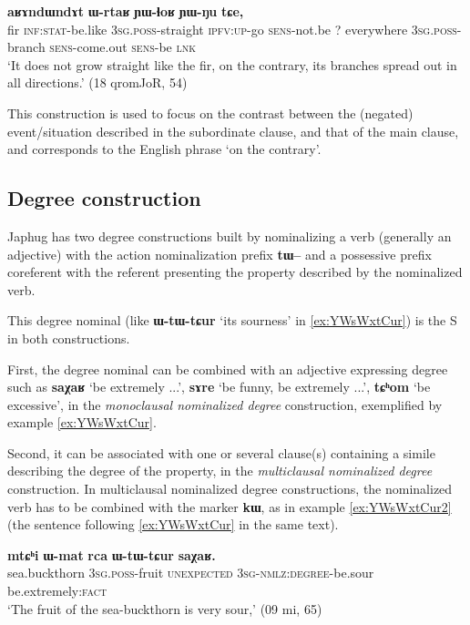 \documentclass[oldfontcommands,oneside,a4paper,11pt]{article}
\newcommand{\ipa}[1]{{\phon\textbf{#1}}}
\begin{document}
  \begin{exe} 
 \ex \label{ex:YWmaR.kW}
\gll [\ipa{tɯrgi} 	\ipa{kɯ-fse} 	\ipa{ɯ-stu} 	\ipa{tu-ɕe} 	\ipa{ɲɯ-maʁ}] 	\ipa{kɯ,} \ipa{aʁɤndɯndɤt} 	\ipa{ɯ-rtaʁ} 	\ipa{ɲɯ-ɬoʁ} 	\ipa{ɲɯ-ŋu} 	\ipa{tɕe,} 
\\
fir \textsc{inf:stat}-be.like \textsc{3sg.poss}-straight \textsc{ipfv:up}-go \textsc{sens}-not.be ?{ } everywhere \textsc{3sg.poss}-branch \textsc{sens}-come.out \textsc{sens}-be \textsc{lnk} \\ 
\glt `It does not grow straight like the fir, on the contrary, its branches spread out in all directions.'  
(18 qromJoR, 54)
 \end{exe}  
 
 This construction is used to focus on the contrast between the (negated) event/situation described in the subordinate clause, and that of the main clause, and corresponds to the English phrase `on the contrary'.
 
\subsection{Degree construction} \label{sec:degree}
 
 
Japhug has two degree constructions built by nominalizing a verb (generally an adjective)  with the action nominalization prefix  \ipa{tɯ--}  and a possessive prefix coreferent with the referent presenting the property described by the nominalized verb. 

This degree nominal (like \ipa{ɯ-tɯ-tɕur} `its sourness' in \ref{ex:YWsWxtCur}) is the S in both constructions.

First, the degree nominal can be  combined with an adjective expressing degree such as \ipa{saχaʁ} `be extremely ...', \ipa{sɤre} `be funny, be extremely ...', \ipa{tɕʰom} `be excessive', in the \textit{monoclausal nominalized degree} construction, exemplified by example \ref{ex:YWsWxtCur}.

Second, it can be associated  with one or several  clause(s) containing a simile describing the degree of the property, in the \textit{multiclausal nominalized degree} construction. In multiclausal nominalized degree constructions, the nominalized verb has to be combined with the marker \ipa{kɯ}, as in   example \ref{ex:YWsWxtCur2} (the sentence following  \ref{ex:YWsWxtCur} in the same text).



\begin{exe}
\ex \label{ex:YWsWxtCur}
\gll 
\ipa{mtɕʰi}  	\ipa{ɯ-mat}  	\ipa{rca}  	\ipa{ɯ-tɯ-tɕur}  	\ipa{saχaʁ.}  	   \\
sea.buckthorn \textsc{3sg.poss}-fruit \textsc{unexpected} \textsc{3sg-nmlz:degree}-be.sour be.extremely:\textsc{fact}   \\
\glt `The fruit of the sea-buckthorn is very sour,' (09 mi, 65)
\end{exe}
\end{document}
